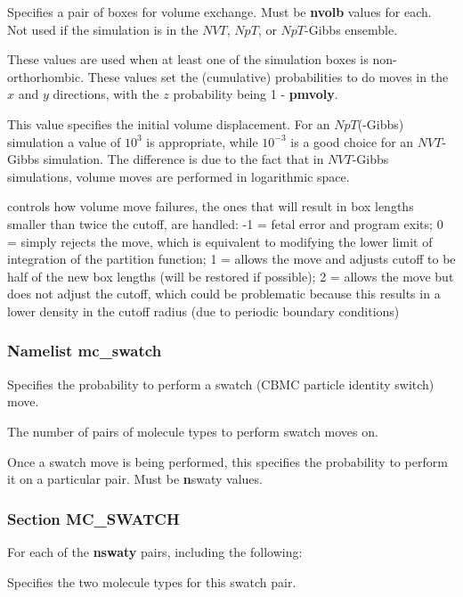 \documentclass[12pt,letterpaper]{article}
\begin{document}
 Specifies a pair of boxes for
volume exchange. Must be {\bf nvolb} values for each. Not
used if the simulation is in the $NVT$, $NpT$, or
$NpT$-Gibbs ensemble.

 These values are used when at
least one of the simulation boxes is non-orthorhombic. These
values set the (cumulative) probabilities to do moves in the
$x$ and $y$ directions, with the $z$ probability being 1 -
{\bf pmvoly}.

 This value specifies the initial
volume displacement. For an $NpT$(-Gibbs) simulation a value
of $10^3$ is appropriate, while $10^{-3}$ is a good choice
for an $NVT$-Gibbs simulation. The difference is due to the
fact that in $NVT$-Gibbs simulations, volume moves are
performed in logarithmic space.

 controls how volume
move failures, the ones that will result in box lengths
smaller than twice the cutoff, are handled: -1 = fetal error
and program exits; 0 = simply rejects the move, which is
equivalent to modifying the lower limit of integration of
the partition function; 1 = allows the move and adjusts
cutoff to be half of the new box lengths (will be restored
if possible); 2 = allows the move but does not adjust the
cutoff, which could be problematic because this results in a
lower density in the cutoff radius (due to periodic boundary
conditions)

\subsubsection{Namelist \textbf{mc\_swatch}}
 Specifies the probability to perform
a swatch (CBMC particle identity switch) move.

 The number of pairs of molecule types
to perform swatch moves on.

 Once a swatch move is being
performed, this specifies the probability to perform it on a
particular pair. Must be {\textbf nswaty} values.

\subsubsection{Section \textbf{MC\_SWATCH}}
For each of the \textbf{nswaty} pairs, including the
following:

 Specifies the two molecule types for this swatch pair.
\end{document}
